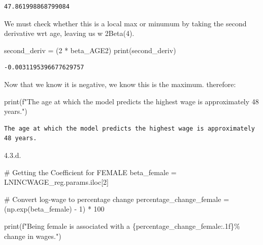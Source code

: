 \documentclass[
  11pt,
  letterpaper,
  DIV=11,
  numbers=noendperiod]{scrartcl}
\newenvironment{Shaded}{\begin{snugshade}}{\end{snugshade}}
\newcommand{\BuiltInTok}[1]{\textcolor[rgb]{0.00,0.23,0.31}{#1}}
\newcommand{\CommentTok}[1]{\textcolor[rgb]{0.37,0.37,0.37}{#1}}
\newcommand{\DecValTok}[1]{\textcolor[rgb]{0.68,0.00,0.00}{#1}}
\newcommand{\NormalTok}[1]{\textcolor[rgb]{0.00,0.23,0.31}{#1}}
\newcommand{\OperatorTok}[1]{\textcolor[rgb]{0.37,0.37,0.37}{#1}}
\newcommand{\SpecialCharTok}[1]{\textcolor[rgb]{0.37,0.37,0.37}{#1}}
\newcommand{\SpecialStringTok}[1]{\textcolor[rgb]{0.13,0.47,0.30}{#1}}
\begin{document}
\begin{verbatim}
47.861998868799084
\end{verbatim}

We must check whether this is a local max or minumum by taking the
second derivative wrt age, leaving us w 2Beta(4).

\begin{Shaded}
\begin{Highlighting}[]
\NormalTok{second\_deriv }\OperatorTok{=}\NormalTok{ (}\DecValTok{2} \OperatorTok{*}\NormalTok{ beta\_AGE2)}
\BuiltInTok{print}\NormalTok{(second\_deriv)}
\end{Highlighting}
\end{Shaded}

\begin{verbatim}
-0.0031195396677629757
\end{verbatim}

Now that we know it is negative, we know this is the maximum. therefore:

\begin{Shaded}
\begin{Highlighting}[]
\BuiltInTok{print}\NormalTok{(}\SpecialStringTok{f"The age at which the model predicts the highest wage is approximately 48 years."}\NormalTok{)}
\end{Highlighting}
\end{Shaded}

\begin{verbatim}
The age at which the model predicts the highest wage is approximately 48 years.
\end{verbatim}

4.3.d.

\begin{Shaded}
\begin{Highlighting}[]
\CommentTok{\# Getting the Coefficient for FEMALE}
\NormalTok{beta\_female }\OperatorTok{=}\NormalTok{ LNINCWAGE\_reg.params.iloc[}\DecValTok{2}\NormalTok{]   }

\CommentTok{\# Convert log{-}wage to percentage change}
\NormalTok{percentage\_change\_female }\OperatorTok{=}\NormalTok{ (np.exp(beta\_female) }\OperatorTok{{-}} \DecValTok{1}\NormalTok{) }\OperatorTok{*} \DecValTok{100}

\BuiltInTok{print}\NormalTok{(}\SpecialStringTok{f"Being female is associated with a }\SpecialCharTok{\{}\NormalTok{percentage\_change\_female}\SpecialCharTok{:.1f\}}\SpecialStringTok{\% change in wages."}\NormalTok{)}
\end{Highlighting}
\end{Shaded}
\end{document}
